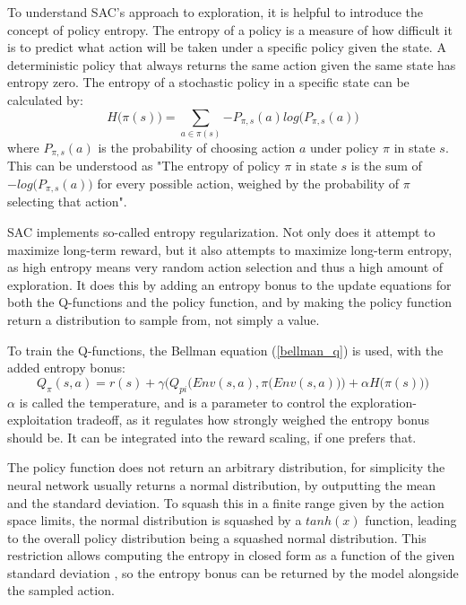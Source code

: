To understand SAC's approach to exploration, it is helpful to introduce the concept of policy entropy. The entropy of a policy is a measure of how difficult it is to predict what action will be taken under a specific policy given the state. A deterministic policy that always returns the same action given the same state has entropy zero. The entropy of a stochastic policy in a specific state can be calculated by:
\begin{equation}
    H\big(\pi(s)\big) = \sum_{a \in \pi(s)}{-P_{\pi, s}(a) log\big(P_{\pi, s}(a)\big)}
\end{equation} where $P_{\pi, s}(a)$ is the probability of choosing action $a$ under policy $\pi$ in state $s$. This can be understood as "The entropy of policy $\pi$ in state $s$ is the sum of $-log\big(P_{\pi, s}(a)\big)$ for every possible action, weighed by the probability of $\pi$ selecting that action".

SAC implements so-called entropy regularization. Not only does it attempt to maximize long-term reward, but it also attempts to maximize long-term entropy, as high entropy means very random action selection and thus a high amount of exploration. It does this by adding an entropy bonus to the update equations for both the Q-functions and the policy function, and by making the policy function return a distribution to sample from, not simply a value.

To train the Q-functions, the Bellman equation (\ref{bellman_q}) is used, with the added entropy bonus:
\begin{equation}
    Q_{\pi}(s, a) = r(s) + \gamma \bigg(Q_{pi}\Big(Env(s, a), \pi\big(Env(s, a)\big)\Big) + \alpha H\big(\pi(s)\big)\bigg)
\end{equation}
$\alpha$ is called the temperature, and is a parameter to control the exploration-exploitation tradeoff, as it regulates how strongly weighed the entropy bonus should be. It can be integrated into the reward scaling, if one prefers that.

The policy function does not return an arbitrary distribution, for simplicity the neural network usually returns a normal distribution, by outputting the mean and the standard deviation. To squash this in a finite range given by the action space limits, the normal distribution is squashed by a $tanh(x)$ function, leading to the overall policy distribution being a squashed normal distribution. This restriction allows computing the entropy in closed form as a function of the given standard deviation \cite[explained in detail in the code comments of the SpinningUp SAC implementation]{SpinningUp2018}, so the entropy bonus can be returned by the model alongside the sampled action.

